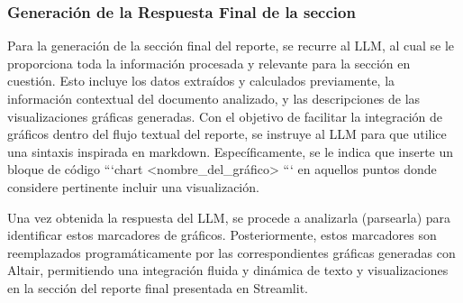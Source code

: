 \subsubsection{Generación de la Respuesta Final de la seccion}

Para la generación de la sección final del reporte, se recurre al LLM, al cual se le proporciona toda la información procesada y relevante para la sección en cuestión. Esto incluye los datos extraídos y calculados previamente, la información contextual del documento analizado, y las descripciones de las visualizaciones gráficas generadas. Con el objetivo de facilitar la integración de gráficos dentro del flujo textual del reporte, se instruye al LLM para que utilice una sintaxis inspirada en markdown. Específicamente, se le indica que inserte un bloque de código ```chart <nombre\_del\_gráfico> ``` en aquellos puntos donde considere pertinente incluir una visualización.

Una vez obtenida la respuesta del LLM, se procede a analizarla (parsearla) para identificar estos marcadores de gráficos. Posteriormente, estos marcadores son reemplazados programáticamente por las correspondientes gráficas generadas con Altair, permitiendo una integración fluida y dinámica de texto y visualizaciones en la sección del reporte final presentada en Streamlit.

